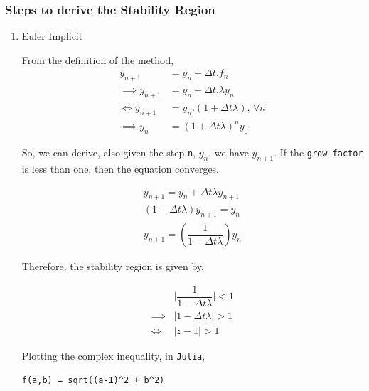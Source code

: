 \documentclass[11pt]{article}
\begin{document}
\subsubsection{Steps to derive the Stability Region}
\label{sec:org4200366}
\begin{enumerate}
\item Euler Implicit
\label{sec:orgb623d32}

From the definition of the method,
\begin{equation}
  \begin{aligned}
y_{n+1}&= y_n + \Delta{t}.f_n\\
\implies y_{n+1} &= y_{n} + \Delta{t}.\lambda{} y_{n}\\
\Leftrightarrow y_{n+1} &= y_{n}.(1+ \Delta{t}\lambda{}), \, \forall{n}\\
\implies y_n &= \left(1+ \Delta{t}\lambda{}\right)^n y_0
\end{aligned}
\end{equation}

So, we can derive, also given the step \texttt{n}, \(y_n\), we have \(y_{n+1}\). If the
\texttt{grow factor} is less than one, then the equation converges.

\begin{equation}
\begin{aligned}
y_{n+1} = y_n + \Delta{t}\lambda y_{n+1}\\
(1 - \Delta{t}\lambda{})y_{n+1} = y_n\\
y_{n+1} = \left(\dfrac{1}{1- \Delta{t} \lambda}\right) y_n
\end{aligned}
\end{equation}

Therefore, the stability region is given by,

\begin{equation}
\begin{aligned}
& \biggr\rvert\dfrac{1}{1- \Delta{t} \lambda} \biggr\rvert < 1 \\
\implies & |1 - \Delta{t} \lambda{}| > 1 \\
\Leftrightarrow & |z - 1| > 1
\end{aligned}
\end{equation}


Plotting the complex inequality, in \texttt{Julia},
\begin{verbatim}
f(a,b) = sqrt((a-1)^2 + b^2)
\end{verbatim}


\end{enumerate}
\end{document}
